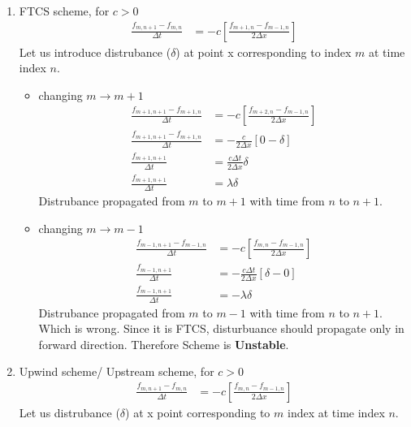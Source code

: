 \documentclass[fleqn,10pt]{SelfArx} %
\begin{document}
\begin{enumerate}
	\item FTCS scheme, for \( c > 0 \)
		\begin{align*}
			\frac{f_{m,n+1} - f_{m,n}}{\Delta t} &= -c\left[\frac{f_{m+1,n} - f_{m-1,n}}{2\Delta x}\right]
		\end{align*}
		Let us introduce distrubance (\( \delta \)) at point x corresponding to index \( m \) at time index \( n \). \\
		\begin{itemize}
			\item changing \( m \rightarrow m+1 \)
			\begin{align*}
				\frac{f_{m+1,n+1} - f_{m+1,n}}{\Delta t} &= -c\left[\frac{f_{m+2,n} - f_{m-1,n}}{2\Delta x}\right] \\
				\frac{f_{m+1,n+1} - f_{m+1,n}}{\Delta t} &= -\frac{c}{2\Delta x}\left[0-\delta\right] \\
				\frac{f_{m+1,n+1}}{\Delta t} &= \frac{c\Delta t}{2\Delta x}\delta \\
				\frac{f_{m+1,n+1}}{\Delta t} &= \lambda\delta \tag{19.4} \label{eq:19.4}
			\end{align*}
			Distrubance propagated from \( m \) to \( m+1 \) with time from \( n \) to \( n +1 \).
			\item changing \( m \rightarrow m-1 \)
			\begin{align*}
				\frac{f_{m-1,n+1} - f_{m-1,n}}{\Delta t} &= -c\left[\frac{f_{m,n} - f_{m-1,n}}{2\Delta x}\right] \\
				\frac{f_{m-1,n+1}}{\Delta t} &= -\frac{c\Delta t}{2\Delta x}[\delta - 0 ] \\
				\frac{f_{m-1,n+1}}{\Delta t} &= -\lambda\delta \tag{19.5} \label{eq:19.5}
			\end{align*}
			Distrubance propagated from \( m \) to \( m-1 \) with time from \( n \) to \( n +1 \). \\
			Which is wrong. Since it is FTCS, disturbuance should propagate only in forward direction. Therefore Scheme is \textbf{Unstable}.
		\end{itemize}
	\item Upwind scheme/ Upstream scheme, for \( c > 0 \)
		\begin{align*}
			\frac{f_{m,n+1} - f_{m,n}}{\Delta t} &= -c\left[\frac{f_{m,n} - f_{m-1,n}}{2\Delta x}\right]
		\end{align*}
		Let us distrubance (\( \delta \)) at x point corresponding to \( m \) index at time index \( n \). \\

\end{enumerate}
\end{document}

